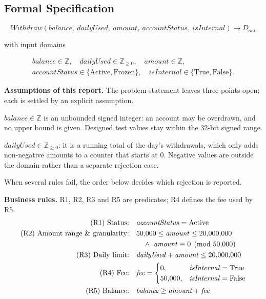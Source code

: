 \documentclass[11pt,a4paper]{article}
\begin{document}
\subsection{Formal Specification}
\label{sec:atm-spec}

\begin{equation}
\mathit{Withdraw}(\mathit{balance},\ \mathit{dailyUsed},\ \mathit{amount},\
\mathit{accountStatus},\ \mathit{isInternal}) \to D_{out}
\end{equation}

with input domains

\begin{gather*}
\mathit{balance}\in\mathbb{Z},\quad
\mathit{dailyUsed}\in\mathbb{Z}_{\ge0},\quad
\mathit{amount}\in\mathbb{Z},\\
\mathit{accountStatus}\in\{\mathrm{Active},\mathrm{Frozen}\},\quad
\mathit{isInternal}\in\{\mathrm{True},\mathrm{False}\}.
\end{gather*}

\textbf{Assumptions of this report.} The problem statement leaves three
points open; each is settled by an explicit assumption.
\begin{description}[style=nextline,leftmargin=1.2em]
    \item[(AS1) Balance.] \(\mathit{balance}\in\mathbb{Z}\) is an unbounded
    signed integer: an account may be overdrawn, and no upper bound is given.
    Designed test values stay within the 32-bit signed range.
    \item[(AS2) Amount withdrawn today.] \(\mathit{dailyUsed}\in\mathbb{Z}_{\ge0}\):
    it is a running total of the day's withdrawals, which only adds
    non-negative amounts to a counter that starts at \(0\). Negative values
    are outside the domain rather than a separate rejection case.
    \item[(AS3) Evaluation order.] When several rules fail, the order below
    decides which rejection is reported.
\end{description}

\textbf{Business rules.} R1, R2, R3 and R5 are predicates; R4 defines the
fee used by R5.
\begin{align}
\text{(R1) Status:}\quad & \mathit{accountStatus}=\mathrm{Active} \\
\text{(R2) Amount range \& granularity:}\quad &
50{,}000 \le \mathit{amount} \le 20{,}000{,}000 \notag\\
&\quad{}\wedge\ \mathit{amount}\equiv 0 \pmod{50{,}000} \\
\text{(R3) Daily limit:}\quad & \mathit{dailyUsed}+\mathit{amount} \le 20{,}000{,}000 \\
\text{(R4) Fee:}\quad & \mathit{fee}=
\begin{cases} 0, & \mathit{isInternal}=\mathrm{True}\\
50{,}000, & \mathit{isInternal}=\mathrm{False}\end{cases} \\
\text{(R5) Balance:}\quad & \mathit{balance}\ge \mathit{amount}+\mathit{fee}
\end{align}
\end{document}
